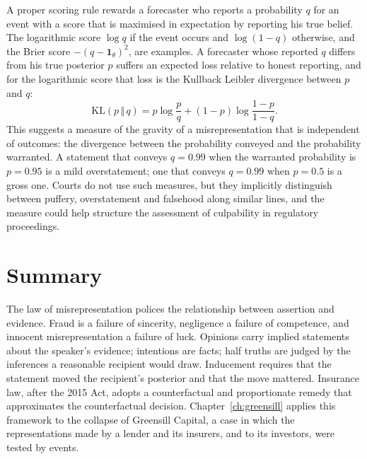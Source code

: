 A proper scoring rule rewards a forecaster who reports a probability $q$ for an event with a score that is maximised in expectation by reporting his true belief. The logarithmic score $\log q$ if the event occurs and $\log(1-q)$ otherwise, and the Brier score $-(q - \mathbf{1}_{\theta})^2$, are examples. A forecaster whose reported $q$ differs from his true posterior $p$ suffers an expected loss relative to honest reporting, and for the logarithmic score that loss is the Kullback Leibler divergence between $p$ and $q$:
\begin{equation}
\mathrm{KL}(p \,\Vert\, q) = p\log\frac{p}{q} + (1-p)\log\frac{1-p}{1-q}.
\end{equation}
This suggests a measure of the gravity of a misrepresentation that is independent of outcomes: the divergence between the probability conveyed and the probability warranted. A statement that conveys $q = 0.99$ when the warranted probability is $p = 0.95$ is a mild overstatement; one that conveys $q = 0.99$ when $p = 0.5$ is a gross one. Courts do not use such measures, but they implicitly distinguish between puffery, overstatement and falsehood along similar lines, and the measure could help structure the assessment of culpability in regulatory proceedings.

\section{Summary}

The law of misrepresentation polices the relationship between assertion and evidence. Fraud is a failure of sincerity, negligence a failure of competence, and innocent misrepresentation a failure of luck. Opinions carry implied statements about the speaker's evidence; intentions are facts; half truths are judged by the inferences a reasonable recipient would draw. Inducement requires that the statement moved the recipient's posterior and that the move mattered. Insurance law, after the 2015 Act, adopts a counterfactual and proportionate remedy that approximates the counterfactual decision. Chapter~\ref{ch:greensill} applies this framework to the collapse of Greensill Capital, a case in which the representations made by a lender and its insurers, and to its investors, were tested by events.

